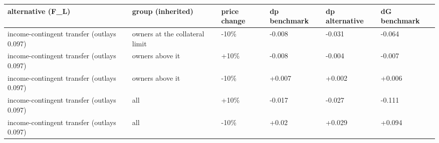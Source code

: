 \begingroup\small
\setlength{\tabcolsep}{3pt}
\renewcommand{\arraystretch}{1.04}
\begin{tabularx}{\linewidth}{XXXXXX}
\toprule
alternative (F\_L) & group (inherited) & price change & dp benchmark & dp alternative & dG benchmark \\
\midrule
income-contingent transfer (outlays 0.097) & owners at the collateral limit & -10\% & -0.008 & -0.031 & -0.064 \\
income-contingent transfer (outlays 0.097) & owners above it & +10\% & -0.008 & -0.004 & -0.007 \\
income-contingent transfer (outlays 0.097) & owners above it & -10\% & +0.007 & +0.002 & +0.006 \\
income-contingent transfer (outlays 0.097) & all & +10\% & -0.017 & -0.027 & -0.111 \\
income-contingent transfer (outlays 0.097) & all & -10\% & +0.02 & +0.029 & +0.094 \\
\bottomrule
\end{tabularx}
\endgroup
